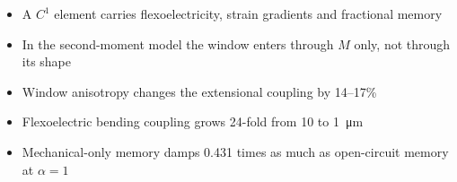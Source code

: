 \documentclass[11pt]{article}
\begin{document}
\begin{itemize}
\item A $C^1$ element carries flexoelectricity, strain gradients and fractional memory
\item In the second-moment model the window enters through $M$ only, not through its shape
\item Window anisotropy changes the extensional coupling by 14--17\%
\item Flexoelectric bending coupling grows 24-fold from \SI{10}{} to \SI{1}{\micro\meter}
\item Mechanical-only memory damps 0.431 times as much as open-circuit memory at $\alpha=1$
\end{itemize}
\end{document}

